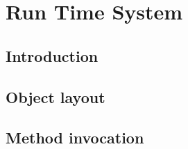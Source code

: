 \chapter{Run Time System}

\section{Introduction}

\section{Object layout}

\section{Method invocation}

